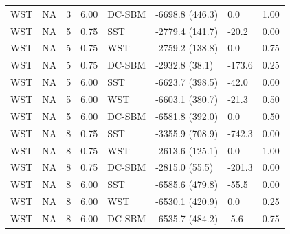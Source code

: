 \begin{table}
\begin{tabular}[t]{llrrllll}
\addlinespace
WST & NA & 3 & 6.00 & DC-SBM & -6698.8 (446.3) & 0.0 & 1.00\\
WST & NA & 5 & 0.75 & SST & -2779.4 (141.7) & -20.2 & 0.00\\
WST & NA & 5 & 0.75 & WST & -2759.2 (138.8) & 0.0 & 0.75\\
WST & NA & 5 & 0.75 & DC-SBM & -2932.8 (38.1) & -173.6 & 0.25\\
WST & NA & 5 & 6.00 & SST & -6623.7 (398.5) & -42.0 & 0.00\\
\addlinespace
WST & NA & 5 & 6.00 & WST & -6603.1 (380.7) & -21.3 & 0.50\\
WST & NA & 5 & 6.00 & DC-SBM & -6581.8 (392.0) & 0.0 & 0.50\\
WST & NA & 8 & 0.75 & SST & -3355.9 (708.9) & -742.3 & 0.00\\
WST & NA & 8 & 0.75 & WST & -2613.6 (125.1) & 0.0 & 1.00\\
WST & NA & 8 & 0.75 & DC-SBM & -2815.0 (55.5) & -201.3 & 0.00\\
\addlinespace
WST & NA & 8 & 6.00 & SST & -6585.6 (479.8) & -55.5 & 0.00\\
WST & NA & 8 & 6.00 & WST & -6530.1 (420.9) & 0.0 & 0.25\\
WST & NA & 8 & 6.00 & DC-SBM & -6535.7 (484.2) & -5.6 & 0.75\\
\bottomrule
\end{tabular}
\end{table}
